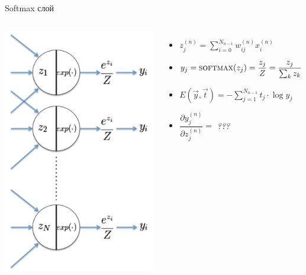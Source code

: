 \documentclass[10pt]{beamer}
\begin{document}
\begin{frame}{Softmax слой}

\begin{columns}
    \includegraphics[width=1\textwidth]{images/softmax_layer.png}
	\begin{itemize}
		\item $z^{(n)}_j = \sum^{N_{n-1}}_{i=0} w^{(n)}_{ij}x^{(n)}_i$
		\item $y_j = \textsc{softmax}(z_j) = \dfrac{z_j}{Z} = \dfrac{z_j}{\sum_k z_k}$
		\item $E(\vec y, \vec t) = -\sum_{j = 1}^{N_{n - 1}} t_j \cdot \log y_j$
		\item $\dfrac{\partial y^{(n)}_j}{\partial z^{(n)}_j} = $ \textit{???}
	\end{itemize}	    
\end{columns}

\end{frame}
\end{document}
